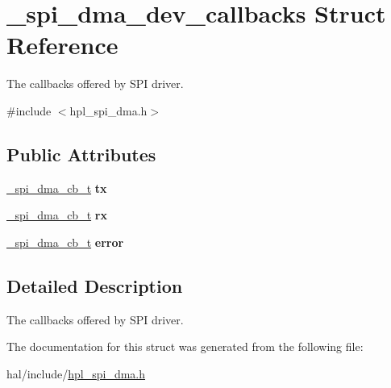 \hypertarget{struct__spi__dma__dev__callbacks}{}\section{\+\_\+spi\+\_\+dma\+\_\+dev\+\_\+callbacks Struct Reference}
\label{struct__spi__dma__dev__callbacks}


The callbacks offered by S\+PI driver.  




{\ttfamily \#include $<$hpl\+\_\+spi\+\_\+dma.\+h$>$}

\subsection*{Public Attributes}
\begin{DoxyCompactItemize}
\item 
\mbox{\label{struct__spi__dma__dev__callbacks_a05f4d00bab5a5320c2fbf2793358e8f0}} 
\hyperlink{hpl__spi__dma_8h_ae7c46033731e549163962bd7c79cab78}{\+\_\+spi\+\_\+dma\+\_\+cb\+\_\+t} {\bfseries tx}
\item 
\mbox{\label{struct__spi__dma__dev__callbacks_a89fce8d418dcff3292eda5cab720eb76}} 
\hyperlink{hpl__spi__dma_8h_ae7c46033731e549163962bd7c79cab78}{\+\_\+spi\+\_\+dma\+\_\+cb\+\_\+t} {\bfseries rx}
\item 
\mbox{\label{struct__spi__dma__dev__callbacks_a3d4a435c8789adf8098818caefe6689d}} 
\hyperlink{hpl__spi__dma_8h_ae7c46033731e549163962bd7c79cab78}{\+\_\+spi\+\_\+dma\+\_\+cb\+\_\+t} {\bfseries error}
\end{DoxyCompactItemize}


\subsection{Detailed Description}
The callbacks offered by S\+PI driver. 

The documentation for this struct was generated from the following file\+:\begin{DoxyCompactItemize}
\item 
hal/include/\hyperlink{hpl__spi__dma_8h}{hpl\+\_\+spi\+\_\+dma.\+h}\end{DoxyCompactItemize}
